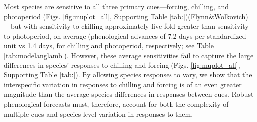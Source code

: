 \documentclass{article}\usepackage[]{graphicx}\usepackage[]{color}
\begin{document}
Most species are sensitive to all three primary cues---forcing, chilling, and photoperiod (Figs. \ref{fig:muplot_all}, Supporting Table \ref{tab:})\citep[see also][]{Laube:2014aettinger2020}(Flynn&Wolkovich)---but with sensitivity to chilling approximately five-fold greater than sensitivity to photoperiod, on average (phenological advances of 7.2 days per standardized unit vs 1.4 days, for chilling and photoperiod, respectively; see Table \ref{tab:modelanglamb}). However, these average sensitivities fail to capture the large differences in species' responses to chilling and forcing (Figs. \ref{fig:muplot_all}, Supporting Table \ref{tab:}). By allowing species responses to vary, we show that the interspecific variation in responses to chilling and forcing is of an even greater magnitude than the average species differences in responses between cues. Robust phenological forecasts must, therefore, account for both the complexity of multiple cues and species-level variation in responses to them.
\end{document}
